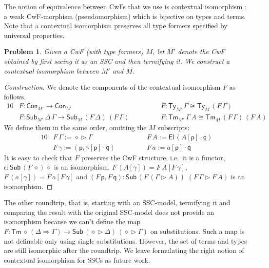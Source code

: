 \documentclass[a4paper,UKenglish,cleveref, autoref, thm-restate]{lipics-v2021}
\newtheorem{problem}[theorem]{Problem}
\newcommand{\ra}{\rightarrow}
\newcommand{\Ra}{\Rightarrow}
\newcommand{\Ty}{\mathsf{Ty}}
\newcommand{\Tm}{\mathsf{Tm}}
\newcommand{\Con}{\mathsf{Con}}
\newcommand{\Sub}{\mathsf{Sub}}
\newcommand{\p}{\mathsf{p}}
\newcommand{\q}{\mathsf{q}}
\newcommand{\ext}{\mathop{\triangleright}}
\newcommand{\U}{\mathsf{U}}
\newcommand{\El}{\mathsf{El}}
\begin{document}
The notion of equivalence between CwFs that we use is contextual
isomorphism \cite{DBLP:journals/corr/abs-2211-07487}: a weak
CwF-morphism (pseudomorphism) which is bijective on types and
terms. Note that a contextual isomorphism preserves all type formers
specified by universal properties.
\begin{problem}
  Given a CwF (with type formers) $M$, let $M'$ denote the CwF
  obtained by first seeing it as an SSC and then termifying it. We
  construct a contextual isomorphism between $M'$ and $M$.
\end{problem}
\begin{proof}[Construction]
  We denote the components of the contextual isomorphism $F$ as follows.
  \begin{alignat*}{10}
    & F : \Con_{M'}\ra\Con_M && F : \Ty_{M'}\,\Gamma \cong \Ty_M\,(F\,\Gamma) \\
    & F : \Sub_{M'}\,\Delta\,\Gamma\ra\Sub_M\,(F\,\Delta)\,(F\,\Gamma)\hspace{3em} && F : \Tm_{M'}\,\Gamma\,A \cong \Tm_M\,(F\,\Gamma)\,(F\,A)
  \end{alignat*}
  We define them in the same order, omitting the $M$ subscripts:
  \begin{alignat*}{10}
    & F\,\Gamma := \diamond\ext\Gamma && F\,A := \El\,(A[\p]\cdot\q) \\
    & F\,\gamma := (\p,\gamma[\p]\cdot\q) \hspace{3em} && F\,a := a[\p]\cdot\q
  \end{alignat*}
  It is easy to check that $F$ preserves the CwF structure, i.e.\ it
  is a functor, $\epsilon : \Sub\,(F\,\diamond)\,\diamond$ is an
  isomorphism, $F\,(A[\gamma]) = F\,A[F\,\gamma]$, $F\,(a[\gamma]) =
  F\,a[F\,\gamma]$ and $(F\,\p,F\,\q) : \Sub\,(F\,(\Gamma\ext
  A))$ $(F\,\Gamma\ext F\,A)$ is an isomorphism. %
\end{proof}
The other roundtrip, that is, starting with an SSC-model, termifying
it and comparing the result with the original SSC-model does not provide an
isomorphism because we can't define the map $F :
\Tm\,\diamond\,(\Delta\Ra\Gamma) \ra
\Sub\,(\diamond\ext\Delta)\,(\diamond\ext\Gamma)$ on
substitutions. Such a map is not definable only using single
substitutions. However, the set of terms and types are still
isomorphic after the roundtrip. We leave formulating the right notion
of contextual isomorphism for SSCs as future work.
\end{document}
